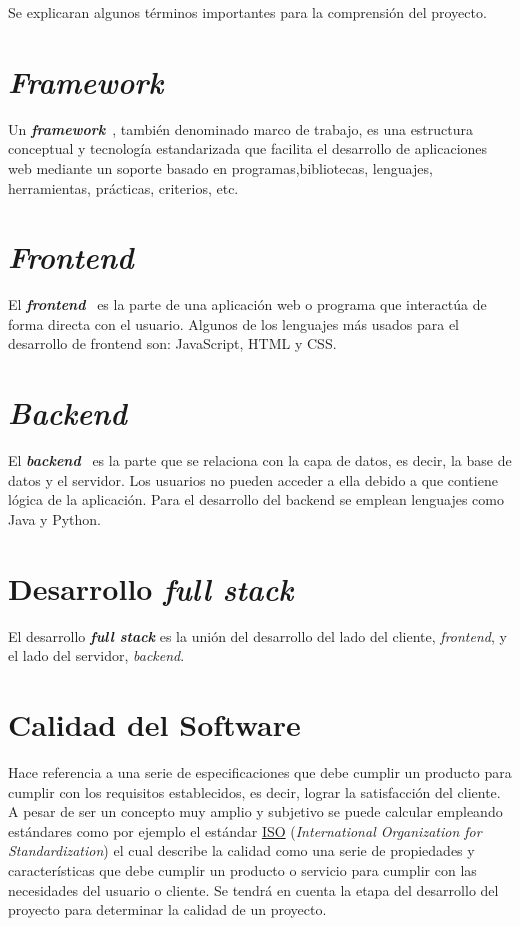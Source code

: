 
Se explicaran algunos términos importantes para la comprensión del proyecto.

\section{\textit{Framework}}
Un \textbf{\textit{framework}}~\cite{framework_definicion}, también denominado marco de trabajo, es una estructura conceptual y tecnología estandarizada que facilita el desarrollo de aplicaciones web mediante un soporte basado en programas,bibliotecas, lenguajes, herramientas, prácticas, criterios, etc.

\section{\textit{Frontend}}
El \textbf{\textit{frontend}}~\cite{frontend_backend} es la parte de una aplicación web o programa que interactúa de forma directa con el usuario. Algunos de los lenguajes más usados para el desarrollo de frontend son: JavaScript, HTML y CSS.

\section{\textit{Backend}}
El \textbf{\textit{backend}}~\cite{frontend_backend} es la parte que se relaciona con la capa de datos, es decir, la base de datos y el servidor. Los usuarios no pueden acceder a ella debido a que contiene lógica de la aplicación. Para el desarrollo del backend se emplean lenguajes como Java y Python.

\section{Desarrollo \textit{full stack}}
El desarrollo \textbf{\textit{full stack}} es la unión del desarrollo del lado del cliente, \textit{frontend}, y el lado del servidor, \textit{backend}.

\section{Calidad del Software}
Hace referencia a una serie de especificaciones que debe cumplir un producto para cumplir con los requisitos establecidos, es decir, lograr la satisfacción del cliente. A pesar de ser un concepto muy amplio y subjetivo se puede calcular empleando estándares como por ejemplo el estándar \href{https://www.iso.org/home.html}{ISO} (\emph{International Organization for Standardization}) el cual describe la calidad como una serie de propiedades y características que debe cumplir un producto o servicio para cumplir con las necesidades del usuario o cliente. Se tendrá en cuenta la etapa del desarrollo del proyecto para determinar la calidad de un proyecto. 

